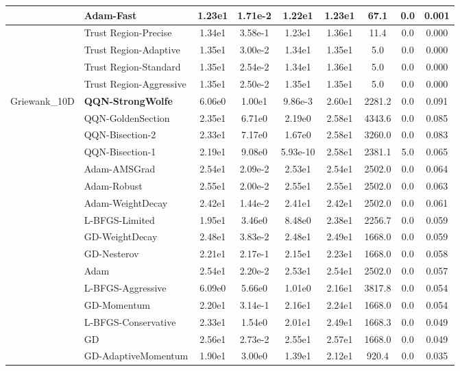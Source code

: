 \documentclass{article}
\begin{document}
\begin{longtable}{|l|l|c|c|c|c|c|c|c|}
\hline
 & Adam-Fast & 1.23e1 & 1.71e-2 & 1.22e1 & 1.23e1 & 67.1 & 0.0 & 0.001 \\
\hline
 & Trust Region-Precise & 1.34e1 & 3.58e-1 & 1.23e1 & 1.36e1 & 11.4 & 0.0 & 0.000 \\
\hline
 & Trust Region-Adaptive & 1.35e1 & 3.00e-2 & 1.34e1 & 1.35e1 & 5.0 & 0.0 & 0.000 \\
\hline
 & Trust Region-Standard & 1.35e1 & 2.54e-2 & 1.34e1 & 1.36e1 & 5.0 & 0.0 & 0.000 \\
\hline
 & Trust Region-Aggressive & 1.35e1 & 2.50e-2 & 1.35e1 & 1.35e1 & 5.0 & 0.0 & 0.000 \\
Griewank\_10D & \textbf{QQN-StrongWolfe} & 6.06e0 & 1.00e1 & 9.86e-3 & 2.60e1 & 2281.2 & 0.0 & 0.091 \\
\hline
 & QQN-GoldenSection & 2.35e1 & 6.71e0 & 2.19e0 & 2.58e1 & 4343.6 & 0.0 & 0.085 \\
\hline
 & QQN-Bisection-2 & 2.33e1 & 7.17e0 & 1.67e0 & 2.58e1 & 3260.0 & 0.0 & 0.083 \\
\hline
 & QQN-Bisection-1 & 2.19e1 & 9.08e0 & 5.93e-10 & 2.58e1 & 2381.1 & 5.0 & 0.065 \\
\hline
 & Adam-AMSGrad & 2.54e1 & 2.09e-2 & 2.53e1 & 2.54e1 & 2502.0 & 0.0 & 0.064 \\
\hline
 & Adam-Robust & 2.55e1 & 2.00e-2 & 2.55e1 & 2.55e1 & 2502.0 & 0.0 & 0.063 \\
\hline
 & Adam-WeightDecay & 2.42e1 & 1.44e-2 & 2.41e1 & 2.42e1 & 2502.0 & 0.0 & 0.061 \\
\hline
 & L-BFGS-Limited & 1.95e1 & 3.46e0 & 8.48e0 & 2.38e1 & 2256.7 & 0.0 & 0.059 \\
\hline
 & GD-WeightDecay & 2.48e1 & 3.83e-2 & 2.48e1 & 2.49e1 & 1668.0 & 0.0 & 0.059 \\
\hline
 & GD-Nesterov & 2.21e1 & 2.17e-1 & 2.15e1 & 2.23e1 & 1668.0 & 0.0 & 0.058 \\
\hline
 & Adam & 2.54e1 & 2.20e-2 & 2.53e1 & 2.54e1 & 2502.0 & 0.0 & 0.057 \\
\hline
 & L-BFGS-Aggressive & 6.09e0 & 5.66e0 & 1.01e0 & 2.16e1 & 3817.8 & 0.0 & 0.054 \\
\hline
 & GD-Momentum & 2.20e1 & 3.14e-1 & 2.16e1 & 2.24e1 & 1668.0 & 0.0 & 0.054 \\
\hline
 & L-BFGS-Conservative & 2.33e1 & 1.54e0 & 2.01e1 & 2.49e1 & 1668.3 & 0.0 & 0.049 \\
\hline
 & GD & 2.56e1 & 2.73e-2 & 2.55e1 & 2.57e1 & 1668.0 & 0.0 & 0.049 \\
\hline
 & GD-AdaptiveMomentum & 1.90e1 & 3.00e0 & 1.39e1 & 2.12e1 & 920.4 & 0.0 & 0.035 \\

\end{longtable}
\end{document}
